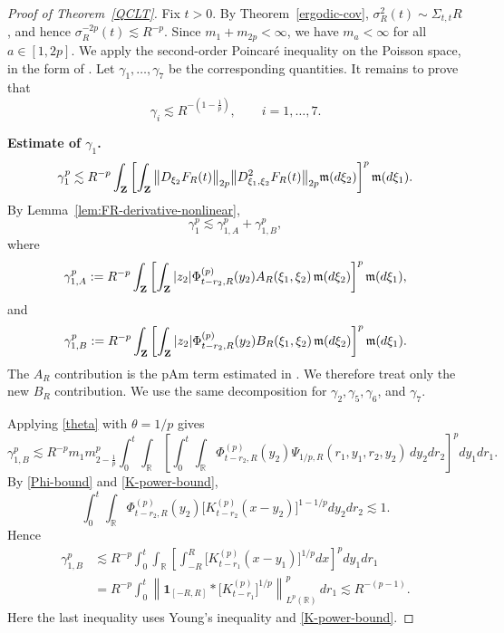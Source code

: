 \documentclass[12pt]{article}
\def\bR{\mathbb{R}}
\newcommand{\fm}{\mathfrak{m}}
\begin{document}
\begin{proof}[ Proof of Theorem~\ref{QCLT}]
Fix \(t>0\). By Theorem~\ref{ergodic-cov},
\(\sigma_R^2(t)\sim \Sigma_{t,t}R\), and hence
\(\sigma_R^{-2p}(t)\lesssim R^{-p}\). Since \(m_1+m_{2p}<\infty\),
we have \(m_a<\infty\) for all \(a\in[1,2p]\). We apply the second-order Poincar\'e inequality on the Poisson space, in the
form of \cite[Theorem~3.4]{T25}.
Let \(\gamma_1,\ldots,\gamma_7\) be the corresponding quantities. It remains
to prove that
\begin{equation}
\label{gamma-goal}
\gamma_i
\lesssim
R^{-\left(1-\frac1p\right)},\qquad i=1,\ldots,7.
\end{equation}

{\bf Estimate of $\gamma_1$.}
\begin{equation}
\label{gamma1}
\gamma_1^p
\lesssim
R^{-p}
\int_{\bf Z}
\left[
\int_{\bf Z}
\big\|D_{\xi_2}F_R(t)\big\|_{2p}
\big\|D^2_{\xi_1,\xi_2}F_R(t)\big\|_{2p}
\fm(d\xi_2)
\right]^p
\fm(d\xi_1).
\end{equation}
By Lemma~\ref{lem:FR-derivative-nonlinear},
\[
\gamma_1^p
\lesssim
\gamma_{1,A}^p+\gamma_{1,B}^p,
\]
where
\[
\gamma_{1,A}^p
:=
R^{-p}
\int_{\bf Z}
\left[
\int_{\bf Z}
|z_2|\Phi_{t-r_2,R}^{(p)}(y_2) A_R(\xi_1,\xi_2)\,\fm(d\xi_2)
\right]^p
\fm(d\xi_1),
\]
and
\[
\gamma_{1,B}^p
:=
R^{-p}
\int_{\bf Z}
\left[
\int_{\bf Z}
|z_2|\Phi_{t-r_2,R}^{(p)}(y_2)  B_R(\xi_1,\xi_2)\,\fm(d\xi_2)
\right]^p
\fm(d\xi_1).
\]
 The $A_R$ contribution is the pAm term estimated in \cite{BLW26}.
We therefore treat only the new $B_R$ contribution. We use the same
decomposition for $\gamma_2,\gamma_5,\gamma_6$, and $\gamma_7$.

 Applying \eqref{theta} with $\theta=1/p$ gives
\begin{equation}
\label{gamma1-B}
\gamma^p_{1,B}\lesssim R^{-p}m_1m_{2-\frac{1}{p}}^p
\int_0^t\int_{\bR}
\left[
\int_0^t\int_{\bR}
\Phi^{(p)}_{t-r_2,R}(y_2)
\Psi_{1/p,R}(r_1,y_1,r_2,y_2)
\,dy_2dr_2
\right]^p
dy_1dr_1 .
\end{equation}
By \eqref{Phi-bound} and \eqref{K-power-bound},
\[
\int_0^t\int_{\bR}
\Phi_{t-r_2,R}^{(p)}(y_2)
\big[K_{t-r_2}^{(p)}(x-y_2)\big]^{1-1/p}
dy_2dr_2
\lesssim 1.
\]
Hence
\begin{align*}
 \gamma_{1,B}^p
&\lesssim
R^{-p}
\int_0^t\int_{\bR}
\left[
\int_{-R}^{R}
\big[K_{t-r_1}^{(p)}(x-y_1)\big]^{1/p}
dx
\right]^p
dy_1dr_1\\
&= R^{-p}
\int_0^t
\left\|\mathbf 1_{[-R,R]}*\big[K_{t-r_1}^{(p)}\big]^{1/p}\right\|_{L^p(\bR)}^p
\,dr_1  \lesssim R^{-(p-1)}.
\end{align*}
Here the last inequality uses Young's inequality and \eqref{K-power-bound}.


\end{proof}
\end{document}
